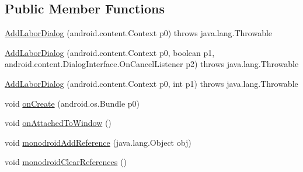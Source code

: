 \subsection*{Public Member Functions}
\begin{DoxyCompactItemize}
\item 
\hyperlink{classfieldservice_1_1android_1_1dialogs_1_1_add_labor_dialog_ae392c0eca2117a984a9384b46e188351}{Add\+Labor\+Dialog} (android.\+content.\+Context p0)  throws java.\+lang.\+Throwable 	
\item 
\hyperlink{classfieldservice_1_1android_1_1dialogs_1_1_add_labor_dialog_aab301f7d7047916a089194aae9cadbf3}{Add\+Labor\+Dialog} (android.\+content.\+Context p0, boolean p1, android.\+content.\+Dialog\+Interface.\+On\+Cancel\+Listener p2)  throws java.\+lang.\+Throwable 	
\item 
\hyperlink{classfieldservice_1_1android_1_1dialogs_1_1_add_labor_dialog_a46ed28b7aeb5db3ffd0449c7c23f7a4c}{Add\+Labor\+Dialog} (android.\+content.\+Context p0, int p1)  throws java.\+lang.\+Throwable 	
\item 
void \hyperlink{classfieldservice_1_1android_1_1dialogs_1_1_add_labor_dialog_a6055cdb5b2730424067c444c9e44906a}{on\+Create} (android.\+os.\+Bundle p0)
\item 
void \hyperlink{classfieldservice_1_1android_1_1dialogs_1_1_add_labor_dialog_a2f8b1f5c64d67e88454e99af0dba8652}{on\+Attached\+To\+Window} ()
\item 
void \hyperlink{classfieldservice_1_1android_1_1dialogs_1_1_add_labor_dialog_a13374c78ca218545f7ad04c9f236550e}{monodroid\+Add\+Reference} (java.\+lang.\+Object obj)
\item 
void \hyperlink{classfieldservice_1_1android_1_1dialogs_1_1_add_labor_dialog_aafc516f1063cf68028bd13e796fa2ff0}{monodroid\+Clear\+References} ()
\end{DoxyCompactItemize}


